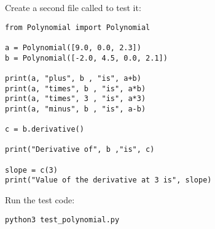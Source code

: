 Create a second file called  to test it:
\begin{Verbatim}[commandchars=\\\{\}]
from Polynomial import Polynomial

a = Polynomial([9.0, 0.0, 2.3])
b = Polynomial([-2.0, 4.5, 0.0, 2.1])

print(a, "plus", b , "is", a+b)
print(a, "times", b , "is", a*b)
print(a, "times", 3 , "is", a*3)
print(a, "minus", b , "is", a-b)

c = b.derivative()

print("Derivative of", b ,"is", c)

slope = c(3)
print("Value of the derivative at 3 is", slope)

\end{Verbatim}

Run the test code:
\begin{Verbatim}
python3 test_polynomial.py
\end{Verbatim}


